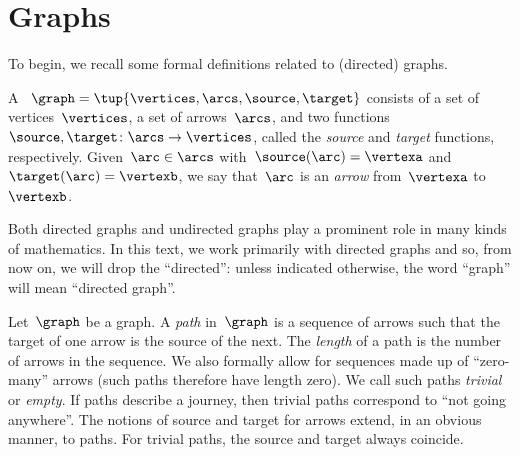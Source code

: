

\section{Graphs}

\publictodomessage
{}
To begin, we recall some formal definitions related to (directed) graphs.


\begin{definition}[Graph]
    \label{def:Graph}
    A \emph{}~$\graph=\tup{\vertices,\arcs, \source,\target}$ consists of a set of vertices~$\vertices$, a set of arrows~$\arcs$, and two functions~$\source,\target \colon \arcs \to \vertices$, called the \emph{source} and \emph{target} functions, respectively.
    Given~$\arc\in \arcs$ with~$\source(\arc)=\vertexa$ and~$\target(\arc)=\vertexb$, we say that~$\arc$ is an \emph{arrow} from~$\vertexa$ to~$\vertexb$.
\end{definition}

\begin{remark}
    Both directed graphs and undirected graphs play a prominent role in many kinds of mathematics.
    In this text, we work primarily with directed graphs and so, from now on, we will drop the ``directed'': unless indicated otherwise, the word ``graph'' will mean ``directed graph''.
\end{remark}

\begin{definition}[Path]
    \label{def:path}
    Let~$\graph$ be a graph. A \emph{path} in~$\graph$ is a sequence of arrows such that the target of one arrow is the source of the next.
    The \emph{length} of a path is the number of arrows in the sequence.
    We also formally allow for sequences made up of ``zero-many'' arrows (such paths therefore have length zero).
    We call such paths \emph{trivial} or \emph{empty}. If paths describe a journey, then trivial paths correspond to ``not going anywhere''.
    The notions of source and target for arrows extend, in an obvious manner, to paths.
    For trivial paths, the source and target always coincide.
\end{definition}
